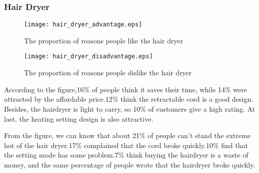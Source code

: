 \documentclass{mcmthesis}
\begin{document}
	\subsubsection{Hair Dryer}
	\begin{figure}[H]
		\begin{minipage}[t]{0.5\textwidth}
			\centering
			\texttt{[image: hair\_dryer\_advantage.eps]}
			\caption{The proportion of reasons people like the hair dryer}
		\end{minipage}
		\qquad
		\begin{minipage}[t]{0.5\textwidth}
			\centering
			\texttt{[image: hair\_dryer\_disadvantage.eps]}
			\caption{The proportion of reasons people dislike the hair dryer }
		\end{minipage}
	\end{figure}
	\begin{flushleft}
		According to the figure,16\% of people think it saves their time, while 14\% were attracted by the affordable price.12\% think the retractable cord is a good design. Besides, the hairdryer is light to carry, so 10\% of customers give a high rating. At last, the heating setting design is also attractive.
	\end{flushleft}
	\begin{flushleft}
		From the figure, we can know that about 21\% of people can't stand the extreme hot of the hair dryer.17\% complained that the cord broke quickly.10\% find that the setting mode has some problem.7\% think buying the hairdryer is a waste of money, and the same percentage of people wrote that the hairdryer broke quickly.
	\end{flushleft}
	
\end{document}
